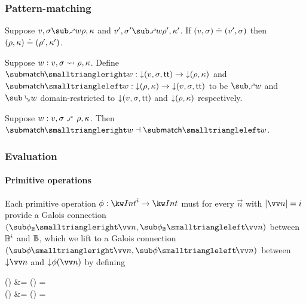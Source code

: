 


\subsubsection{Pattern-matching}




\begin{lemma}
   Suppose $v, \sigma \matchFwdR{w} \rho, \kappa$ and $v', \sigma' \matchFwdR{w} \rho', \kappa'$. If $(v, \sigma) \doteq (v', \sigma)$ then $(\rho, \kappa) \doteq (\rho', \kappa')$.
\end{lemma}

\begin{definition}
   Suppose $w: v, \sigma \rightsquigarrow \rho, \kappa$. Define $\matchFwdF{w}: \Below{(v,\sigma,\TT)} \to \Below{(\rho,\kappa)}$ and $\matchBwdF{w}: \Below{(\rho,\kappa)} \to \Below{(v,\sigma,\TT)}$ to be $\matchFwdR{w}$ and $\matchBwdR{w}$ domain-restricted to ${\downarrow}{(v,\sigma,\mathsf{tt})}$ and ${\downarrow}{(\rho,\kappa)}$ respectively.
\end{definition}

\begin{theorem}
\label{thm:core-language:match:gc}
   Suppose $w: v, \sigma \matchFwdS \rho, \kappa$.  Then $\matchFwdF{w} \adjoint \matchBwdF{w}$.
\end{theorem}

\subsubsection{Evaluation}

\paragraph{Primitive operations}

Each primitive operation $\phi: \tyInt^{i} \to \tyInt$ must for every $\vec{n}$ with $\length{\vec{n}} = i$ provide a Galois connection $(\primFwdBool{\phi}{\vec{n}}, \primBwdBool{\phi}{\vec{n}})$ between $\mathbb{B}^i$ and $\mathbb{B}$, which we lift to a Galois connection $(\primFwd{\phi}{\vec{n}}, \primBwd{\phi}{\vec{n}})$ between $\Below{\vec{n}}$ and $\Below{\phi(\vec{n})}$ by defining
\begin{definition}
\label{def:core-language:primop-gc}
\begin{salign}
   () &= 
   (\vec{\alpha}) = \beta
   \\
   () &= 
   (\beta) = \vec{\alpha}
\end{salign}
\end{definition}

